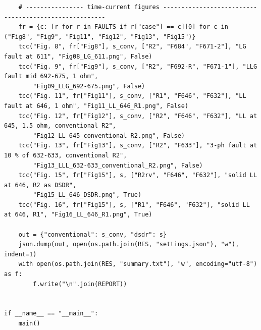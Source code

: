 \documentclass[12pt,a4paper]{article}
\begin{document}
\begin{lstlisting}
    # ---------------- time-current figures ------------------------------------------------------
    fr = {c: [r for r in FAULTS if r["case"] == c][0] for c in ("Fig8", "Fig9", "Fig11", "Fig12", "Fig13", "Fig15")}
    tcc("Fig. 8", fr["Fig8"], s_conv, ["R2", "F684", "F671-2"], "LG fault at 611", "Fig08_LG_611.png", False)
    tcc("Fig. 9", fr["Fig9"], s_conv, ["R2", "F692-R", "F671-1"], "LLG fault mid 692-675, 1 ohm",
        "Fig09_LLG_692-675.png", False)
    tcc("Fig. 11", fr["Fig11"], s_conv, ["R1", "F646", "F632"], "LL fault at 646, 1 ohm", "Fig11_LL_646_R1.png", False)
    tcc("Fig. 12", fr["Fig12"], s_conv, ["R2", "F646", "F632"], "LL at 645, 1.5 ohm, conventional R2",
        "Fig12_LL_645_conventional_R2.png", False)
    tcc("Fig. 13", fr["Fig13"], s_conv, ["R2", "F633"], "3-ph fault at 10 % of 632-633, conventional R2",
        "Fig13_LLL_632-633_conventional_R2.png", False)
    tcc("Fig. 15", fr["Fig15"], s, ["R2rv", "F646", "F632"], "solid LL at 646, R2 as DSDR",
        "Fig15_LL_646_DSDR.png", True)
    tcc("Fig. 16", fr["Fig15"], s, ["R1", "F646", "F632"], "solid LL at 646, R1", "Fig16_LL_646_R1.png", True)

    out = {"conventional": s_conv, "dsdr": s}
    json.dump(out, open(os.path.join(RES, "settings.json"), "w"), indent=1)
    with open(os.path.join(RES, "summary.txt"), "w", encoding="utf-8") as f:
        f.write("\n".join(REPORT))


if __name__ == "__main__":
    main()
\end{lstlisting}
\end{document}
